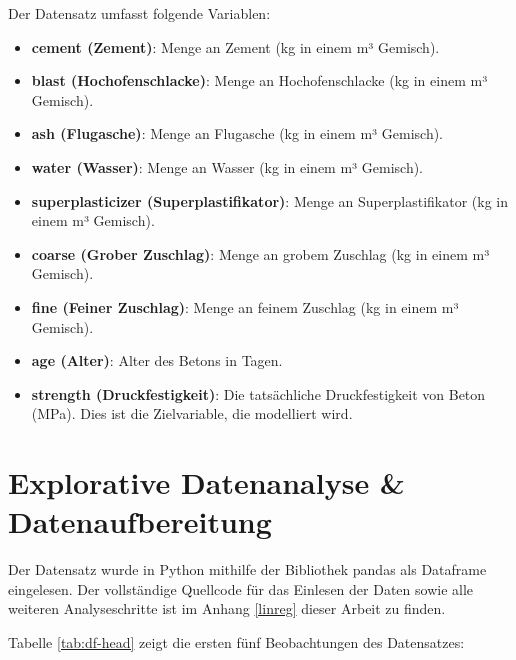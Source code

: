 Der Datensatz umfasst folgende Variablen:

\begin{itemize}
    \item \textbf{cement (Zement)}: Menge an Zement (kg in einem m³ Gemisch).
    \item \textbf{blast (Hochofenschlacke)}: Menge an Hochofenschlacke (kg in einem m³ Gemisch). 
    \item \textbf{ash (Flugasche)}: Menge an Flugasche (kg in einem m³ Gemisch). 
    \item \textbf{water (Wasser)}: Menge an Wasser (kg in einem m³ Gemisch).
    \item \textbf{superplasticizer (Superplastifikator)}: Menge an Superplastifikator (kg in einem m³ Gemisch).
    \item \textbf{coarse (Grober Zuschlag)}: Menge an grobem Zuschlag (kg in einem m³ Gemisch).
    \item \textbf{fine (Feiner Zuschlag)}: Menge an feinem Zuschlag (kg in einem m³ Gemisch).
    \item \textbf{age (Alter)}: Alter des Betons in Tagen.
    \item \textbf{strength (Druckfestigkeit)}: Die tatsächliche Druckfestigkeit von Beton (MPa). Dies ist die Zielvariable, die modelliert wird.
\end{itemize}

\section{Explorative Datenanalyse \& Datenaufbereitung}

Der Datensatz wurde in Python mithilfe der Bibliothek \textsf{pandas} als \textsf{Dataframe} eingelesen.
Der vollständige Quellcode für das Einlesen der Daten sowie alle weiteren Analyseschritte ist 
im Anhang \ref{linreg} dieser Arbeit zu finden.

Tabelle \ref{tab:df-head} zeigt die ersten fünf Beobachtungen des Datensatzes:

